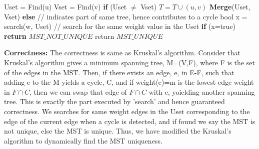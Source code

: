 \documentclass{article}
\newcommand\correctness{\vspace{.10in}\textbf{Correctness: }}
\begin{document}
  \hspace*{1cm}		Uset = Find(u) \newline
  \hspace*{1cm}		Vset = Find(v) \newline
  \hspace*{1cm}		\textbf {if} (Uset $\neq$ Vset) \newline
  \hspace*{1.5cm}		$T = T \cup {(u,v)}$ \newline
  \hspace*{1.5cm}		\textbf {Merge}(Uset, Vset) \newline
  \hspace*{1cm}		\textbf {else} // indicates part of same tree, hence contributes to a cycle \newline
  \hspace*{1.5cm}		bool x = search(w, Uset) // search for the same weight value in the Uset \newline
  \hspace*{1.5cm}		\textbf {if} (x=true) \textbf {return} $MST\_NOT\_UNIQUE$ \newline
  \hspace*{0.5cm} return $MST\_UNIQUE$ \newline

  \correctness 
    The correctness is same as Kruskal's algorithm. Consider that Kruskal's algorithm gives a minimum spanning tree, M=(V,F), where F is the set of the edges in the MST. Then, if there exists an edge, e, in E-F, such that adding e to the M yields a cycle, C, and if weight(e)=m is the lowest edge weight in $F \cap C$, then we can swap that edge of $F \cap C$ with e, yoielding another spanning tree. This is exactly the part executed by 'search' and hence guaranteed correctness. We searches for same weight edges in the Uset corresponding to the edge of the current edge when a cycle is detected, and if found we say the MST is not unique, else the MST is unique. Thus, we have modified the Kruskal's algorithm to dynamically find the MST uniqueness. \newline









 
\end{document}
